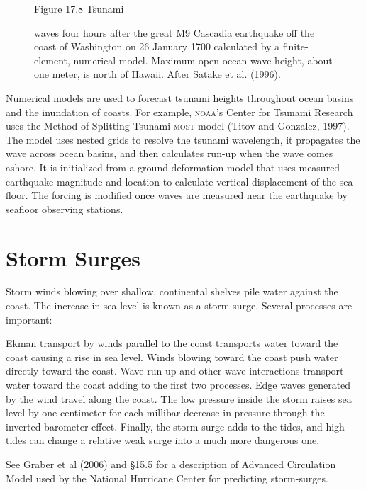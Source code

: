 \begin{figure}[t!]
\footnotesize Figure 17.8 Tsunami \rule{0mm}{3ex}waves four hours after the great M9 Cascadia earthquake off the coast of Washington on 26 January 1700 calculated by a finite-element, numerical model. Maximum open-ocean wave height, about one meter, is north of Hawaii. After Satake et al. (1996).
\label{fig:tsunamiwave}

\vspace{-3ex}
\end{figure}

Numerical models are used to forecast tsunami heights throughout ocean basins and the inundation of coasts. For example, \textsc{noaa}'s Center for Tsunami Research uses the Method of Splitting Tsunami \textsc{most} model (Titov and Gonzalez, 1997). The model uses nested grids to resolve the tsunami wavelength, it propagates the wave across ocean basins, and then calculates run-up when the wave comes ashore. It is initialized from a ground deformation model that uses measured earthquake magnitude and location to calculate vertical displacement of the sea floor. The forcing is modified once waves are measured near the earthquake by seafloor observing stations.

\section{Storm Surges}
Storm winds blowing over shallow, continental shelves pile water against the coast. The increase in sea level is known as a storm surge. Several processes are important:
\begin{enumerate}
\vitem
Ekman transport by winds parallel to the coast transports water toward the coast causing a rise in sea level.
\vitem
Winds blowing toward the coast push water directly toward the coast.
\vitem
Wave run-up and other wave interactions transport water toward the coast adding to the first two processes.
\vitem
Edge waves generated by the wind travel along the coast.
\vitem
The low pressure inside the storm raises sea level by one centimeter for each millibar decrease in pressure through the inverted-barometer effect.
\vitem
Finally, the storm surge adds to the tides, and high tides can change a relative weak surge into a much more dangerous one.
\end{enumerate}
See Graber et al (2006) and \S 15.5 for a description of Advanced Circulation Model used by the National Hurricane Center for predicting storm-surges.

